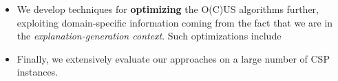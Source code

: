\documentclass[a4paper,UKenglish,cleveref, autoref, thm-restate, pdfa]{lipics-v2021}
\renewcommand\comment[1]{}
\newcommand{\tias}[1]{{\comment{\color{blue}Tias:#1}}}
\newcommand{\emilio}[1]{{\comment{\color{red}Emilio: #1}}}
\newcommand{\bart}[1]{{\comment{\color{OliveGreen}Bart: #1}}}
\newcommand\mm[1]{\ensuremath{#1}\xspace}
\newcommand\call[1]{\mm{\texttt{#1}}}
\newcommand\grow{\mm{\call{Grow}}}
\begin{document}
\begin{itemize}
	\item We develop techniques for \textbf{optimizing} the O(C)US algorithms further, exploiting domain-specific information coming from the fact that we are in the \emph{explanation-generation context}. Such optimizations include 
%
	
	
	\item Finally, we extensively evaluate our approaches on a large number of CSP instances.
	
\end{itemize}
%
%
\end{document}
